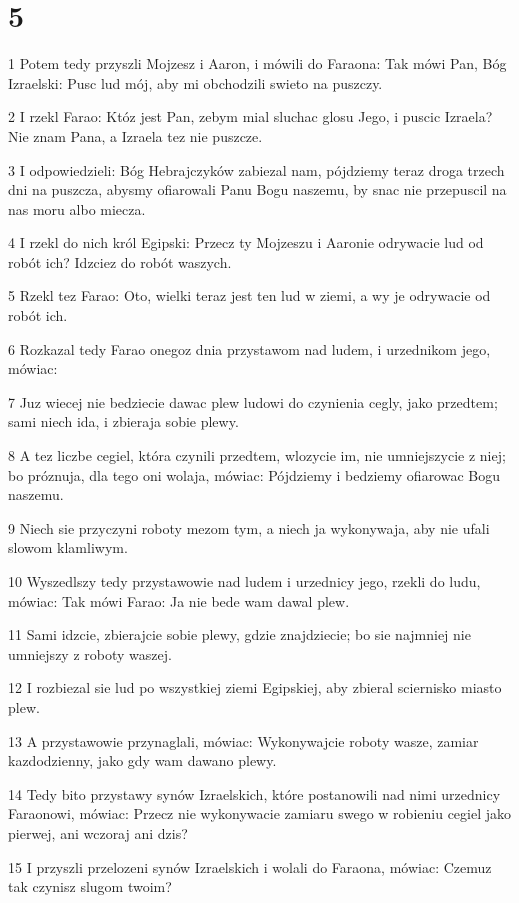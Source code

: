 \chapter{5}

\par 1 Potem tedy przyszli Mojzesz i Aaron, i mówili do Faraona: Tak mówi Pan, Bóg Izraelski: Pusc lud mój, aby mi obchodzili swieto na puszczy.
\par 2 I rzekl Farao: Któz jest Pan, zebym mial sluchac glosu Jego, i puscic Izraela? Nie znam Pana, a Izraela tez nie puszcze.
\par 3 I odpowiedzieli: Bóg Hebrajczyków zabiezal nam, pójdziemy teraz droga trzech dni na puszcza, abysmy ofiarowali Panu Bogu naszemu, by snac nie przepuscil na nas moru albo miecza.
\par 4 I rzekl do nich król Egipski: Przecz ty Mojzeszu i Aaronie odrywacie lud od robót ich? Idzciez do robót waszych.
\par 5 Rzekl tez Farao: Oto, wielki teraz jest ten lud w ziemi, a wy je odrywacie od robót ich.
\par 6 Rozkazal tedy Farao onegoz dnia przystawom nad ludem, i urzednikom jego, mówiac:
\par 7 Juz wiecej nie bedziecie dawac plew ludowi do czynienia cegly, jako przedtem; sami niech ida, i zbieraja sobie plewy.
\par 8 A tez liczbe cegiel, która czynili przedtem, wlozycie im, nie umniejszycie z niej; bo próznuja, dla tego oni wolaja, mówiac: Pójdziemy i bedziemy ofiarowac Bogu naszemu.
\par 9 Niech sie przyczyni roboty mezom tym, a niech ja wykonywaja, aby nie ufali slowom klamliwym.
\par 10 Wyszedlszy tedy przystawowie nad ludem i urzednicy jego, rzekli do ludu, mówiac: Tak mówi Farao: Ja nie bede wam dawal plew.
\par 11 Sami idzcie, zbierajcie sobie plewy, gdzie znajdziecie; bo sie najmniej nie umniejszy z roboty waszej.
\par 12 I rozbiezal sie lud po wszystkiej ziemi Egipskiej, aby zbieral sciernisko miasto plew.
\par 13 A przystawowie przynaglali, mówiac: Wykonywajcie roboty wasze, zamiar kazdodzienny, jako gdy wam dawano plewy.
\par 14 Tedy bito przystawy synów Izraelskich, które postanowili nad nimi urzednicy Faraonowi, mówiac: Przecz nie wykonywacie zamiaru swego w robieniu cegiel jako pierwej, ani wczoraj ani dzis?
\par 15 I przyszli przelozeni synów Izraelskich i wolali do Faraona, mówiac: Czemuz tak czynisz slugom twoim?
